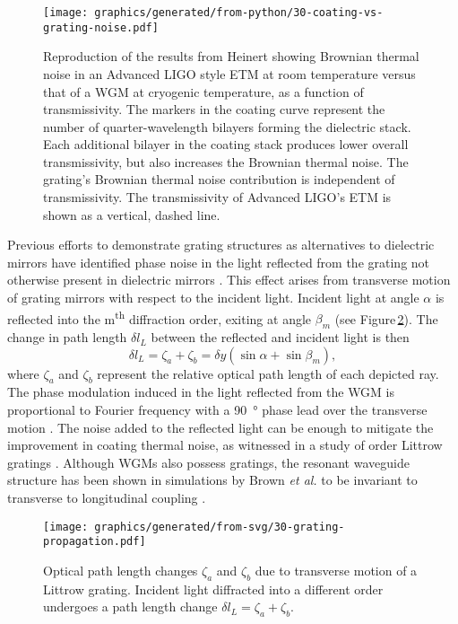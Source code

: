 \begin{figure}
  \centering
  \texttt{[image: graphics/generated/from-python/30-coating-vs-grating-noise.pdf]}
  \caption{\label{fig:coating-vs-grating-noise}Reproduction of the results from Heinert \etal{} \cite{Heinert2013} showing Brownian thermal noise in an Advanced LIGO style \gls{ETM} at room temperature versus that of a \gls{WGM} at cryogenic temperature, as a function of transmissivity. The markers in the coating curve represent the number of quarter-wavelength bilayers forming the dielectric stack. Each additional bilayer in the coating stack produces lower overall transmissivity, but also increases the Brownian thermal noise. The grating's Brownian thermal noise contribution is independent of transmissivity. The transmissivity of Advanced LIGO's ETM is shown as a vertical, dashed line.}
\end{figure}

Previous efforts to demonstrate grating structures as alternatives to dielectric mirrors have identified phase noise in the light reflected from the grating not otherwise present in dielectric mirrors \cite{Wise2005, Freise2007}. This effect arises from transverse motion of grating mirrors with respect to the incident light. Incident light at angle $\alpha$ is reflected into the m\textsuperscript{th} diffraction order, exiting at angle $\beta_m$ (see Figure\,\ref{fig:grating-propagation}). The change in path length $\delta l_L$ between the reflected and incident light is then
\begin{equation}
  \delta l_L = \zeta_a + \zeta_b = \delta y
  \left( \sin{\alpha} + \sin{\beta_m} \right),
\end{equation}
where $\zeta_a$ and $\zeta_b$ represent the relative optical path length of each depicted ray.
The phase modulation induced in the light reflected from the \gls{WGM} is proportional to Fourier frequency with a \SI{90}{\degree} phase lead over the transverse motion \cite{Barr2011}. The noise added to the reflected light can be enough to mitigate the improvement in coating thermal noise, as witnessed in a study of  order Littrow gratings \cite{Barr2011}. Although \glspl{WGM} also possess gratings, the resonant waveguide structure has been shown in simulations by Brown \emph{et al.} to be invariant to transverse to longitudinal coupling \cite{Brown2013}.

\begin{figure}
  \centering
  \texttt{[image: graphics/generated/from-svg/30-grating-propagation.pdf]}
  \caption{\label{fig:grating-propagation}Optical path length changes $\zeta_a$ and $\zeta_b$ due to transverse motion of a Littrow grating. Incident light diffracted into a different order undergoes a path length change $\delta l_L = \zeta_a + \zeta_b$.}
\end{figure}

